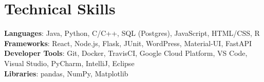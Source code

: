 \documentclass[letterpaper,11pt]{article}
\begin{document}
%
\section{Technical Skills}
 \begin{itemize}[leftmargin=0.15in, label={}]
    \small{\item{
     \textbf{Languages}{: Java, Python, C/C++, SQL (Postgres), JavaScript, HTML/CSS, R} \\
     \textbf{Frameworks}{: React, Node.js, Flask, JUnit, WordPress, Material-UI, FastAPI} \\
     \textbf{Developer Tools}{: Git, Docker, TravisCI, Google Cloud Platform, VS Code, Visual Studio, PyCharm, IntelliJ, Eclipse} \\
     \textbf{Libraries}{: pandas, NumPy, Matplotlib}
    }}
 \end{itemize}


\end{document}
